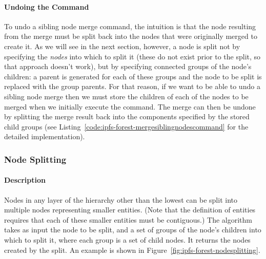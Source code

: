 \paragraph{Undoing the Command}

To undo a sibling node merge command, the intuition is that the node resulting from the merge must be split back into the nodes that were originally merged to create it. As we will see in the next section, however, a node is split not by specifying the \emph{nodes} into which to split it (these do not exist prior to the split, so that approach doesn't work), but by specifying connected groups of the node's children: a parent is generated for each of these groups and the node to be split is replaced with the group parents. For that reason, if we want to be able to undo a sibling node merge then we must store the children of each of the nodes to be merged when we initially execute the command. The merge can then be undone by splitting the merge result back into the components specified by the stored child groups (see Listing~\ref{code:ipfs-forest-mergesiblingnodescommand} for the detailed implementation).


\afterpage{\clearpage}
\newpage

\subsubsection{Node Splitting}


\paragraph{Description}

Nodes in any layer of the hierarchy other than the lowest can be split into multiple nodes representing smaller entities. (Note that the definition of entities requires that each of these smaller entities must be contiguous.) The algorithm takes as input the node to be split, and a set of groups of the node's children into which to split it, where each group is a set of child nodes. It returns the nodes created by the split. An example is shown in Figure~\ref{fig:ipfs-forest-nodesplitting}.

